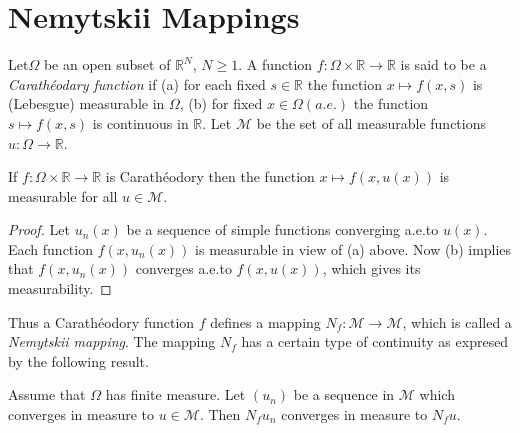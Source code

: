 \chapter{Nemytskii Mappings}\label{chap2}

Let\pageoriginale $\Omega$ be an open subset of $\mathbb{R}^{N}$, $N\geq 1$. A
function $f:\Omega\times \mathbb{R}\to \mathbb{R}$ is said to be a
{\em Carath\'eodary function} if (a) for each fixed $s\in \mathbb{R}$
the function $x\mapsto f(x,s)$ is (Lebesgue) measurable in $\Omega$,
(b) for fixed $x\in \Omega(a.e.)$ the function $s\mapsto f(x,s)$ is
continuous in $\mathbb{R}$. Let $\mathcal{M}$ be the set of all
measurable functions $u:\Omega\to \mathbb{R}$.

\begin{theorem}\label{chap2-thm2.1}
If $f:\Omega\times \mathbb{R}\to \mathbb{R}$ is Carath\'eodory then
the function $x\mapsto f(x,u(x))$ is measurable for all $u\in \mathcal{M}$.
\end{theorem}

\begin{proof}
Let $u_{n}(x)$ be a sequence of simple functions converging a.e.\@ to
$u(x)$. Each function $f(x,u_{n}(x))$ is measurable in view of (a)
above. Now (b) implies that $f(x,u_{n}(x))$ converges a.e.\@ to
$f(x,u(x))$, which gives its measurability.
\end{proof}

Thus a Carath\'eodory function $f$ defines a mapping
$N_{f}:\mathcal{M}\to \mathcal{M}$, which is called a {\em Nemytskii
  mapping}. The mapping $N_{f}$ has a certain type of continuity as
expresed by the following result.

\begin{theorem}\label{chap2-thm2.2}
Assume that $\Omega$ has finite measure. Let $(u_{n})$ be a sequence
in $\mathcal{M}$ which converges in measure to $u\in
\mathcal{M}$. Then $N_{f}u_{n}$ converges in measure to $N_{f}u$.
\end{theorem}

